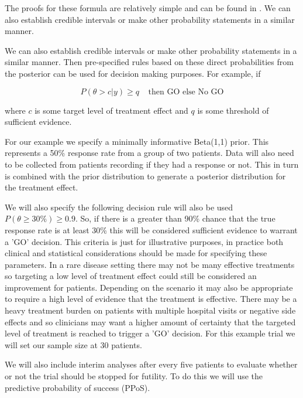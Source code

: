 The proofs for these formula are relatively simple and can be found in \cite{sochBookStatisticalProofs2020}. We can also establish credible intervals or make other probability statements in a similar manner. 

We can also establish credible intervals or make other probability statements in a similar manner. 
Then pre-specified rules based on these direct probabilities from the posterior can be used for decision making purposes. For example, if 

\begin{equation}
	\label{eq_etp:betafinaldecrule}
	P(\theta > c |y) \geq q  \; \; \; \; \text{then GO else No GO}
\end{equation}


where $c$ is some target level of treatment effect and $q$ is some threshold of sufficient evidence.

For our example we specify a minimally informative Beta(1,1) prior. This represents a 50\% response rate from a group of two patients. Data will also need to be collected from patients recording if they had a response or not. This in turn is combined with the prior distribution to generate a posterior distribution for the treatment effect.
 
We will also specify the following decision rule will also be used $P(\theta  \geq 30\%) \geq 0.9$. So, if there is a greater than  90\% chance that the true response rate is at least 30\% this will be considered sufficient evidence to warrant a 'GO' decision. This criteria is just for illustrative purposes, in practice both clinical and statistical considerations should be made for specifying these parameters. In a rare disease setting there may not be many effective treatments so targeting a low level of treatment effect could still be considered an improvement for patients. Depending on the scenario it may also be appropriate to require a high level of evidence that the treatment is effective. There may be a heavy treatment burden on patients with multiple hospital visits or negative side effects and so clinicians may want a higher amount of certainty that the targeted level of treatment is reached to trigger a 'GO' decision. For this example trial we will set our sample size at 30 patients. 

We will also include interim analyses after every five patients to evaluate whether or not the trial should be stopped for futility. To do this we will use the predictive probability of success (PPoS).

